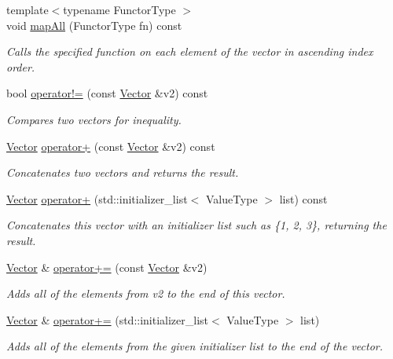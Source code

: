 \begin{DoxyCompactItemize}
{\footnotesize template$<$typename Functor\+Type $>$ }\\void \mbox{\hyperlink{classVector_a8dc32c1e45704cfae41daf8adb4e66dc}{map\+All}} (Functor\+Type fn) const
\begin{DoxyCompactList}\small\item\em Calls the specified function on each element of the vector in ascending index order. \end{DoxyCompactList}\item 
bool \mbox{\hyperlink{classVector_a3e96c4b5c89d1b00f587b521874cd0d8}{operator!=}} (const \mbox{\hyperlink{classVector}{Vector}} \&v2) const
\begin{DoxyCompactList}\small\item\em Compares two vectors for inequality. \end{DoxyCompactList}\item 
\mbox{\hyperlink{classVector}{Vector}} \mbox{\hyperlink{classVector_acb70fcd67f846bf16b96223bcf43e476}{operator+}} (const \mbox{\hyperlink{classVector}{Vector}} \&v2) const
\begin{DoxyCompactList}\small\item\em Concatenates two vectors and returns the result. \end{DoxyCompactList}\item 
\mbox{\hyperlink{classVector}{Vector}} \mbox{\hyperlink{classVector_a2dce2988ba5880d744280b4bbf85b135}{operator+}} (std\+::initializer\+\_\+list$<$ Value\+Type $>$ list) const
\begin{DoxyCompactList}\small\item\em Concatenates this vector with an initializer list such as \{1, 2, 3\}, returning the result. \end{DoxyCompactList}\item 
\mbox{\hyperlink{classVector}{Vector}} \& \mbox{\hyperlink{classVector_a6b35f98e0e64a2fff6891a8806f640fd}{operator+=}} (const \mbox{\hyperlink{classVector}{Vector}} \&v2)
\begin{DoxyCompactList}\small\item\em Adds all of the elements from {\ttfamily v2} to the end of this vector. \end{DoxyCompactList}\item 
\mbox{\hyperlink{classVector}{Vector}} \& \mbox{\hyperlink{classVector_a22e55ed53bfa2da64ecd22b36757fcea}{operator+=}} (std\+::initializer\+\_\+list$<$ Value\+Type $>$ list)
\begin{DoxyCompactList}\small\item\em Adds all of the elements from the given initializer list to the end of the vector. \end{DoxyCompactList}\item 

\end{DoxyCompactItemize}
